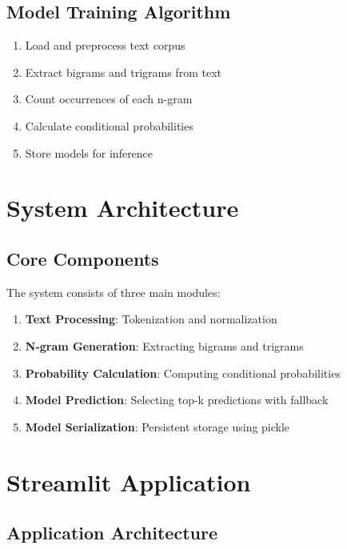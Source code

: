 \documentclass[12pt,a4paper]{report}
\begin{document}
\section{Model Training Algorithm}

\begin{enumerate}
    \item Load and preprocess text corpus
    \item Extract bigrams and trigrams from text
    \item Count occurrences of each n-gram
    \item Calculate conditional probabilities
    \item Store models for inference
\end{enumerate}

\newpage

\newpage

\chapter{System Architecture}

\section{Core Components}

The system consists of three main modules:

\begin{enumerate}
    \item \textbf{Text Processing}: Tokenization and normalization
    \item \textbf{N-gram Generation}: Extracting bigrams and trigrams
    \item \textbf{Probability Calculation}: Computing conditional probabilities
    \item \textbf{Model Prediction}: Selecting top-k predictions with fallback
    \item \textbf{Model Serialization}: Persistent storage using pickle
\end{enumerate}

\chapter{Streamlit Application}

\section{Application Architecture}
\end{document}
